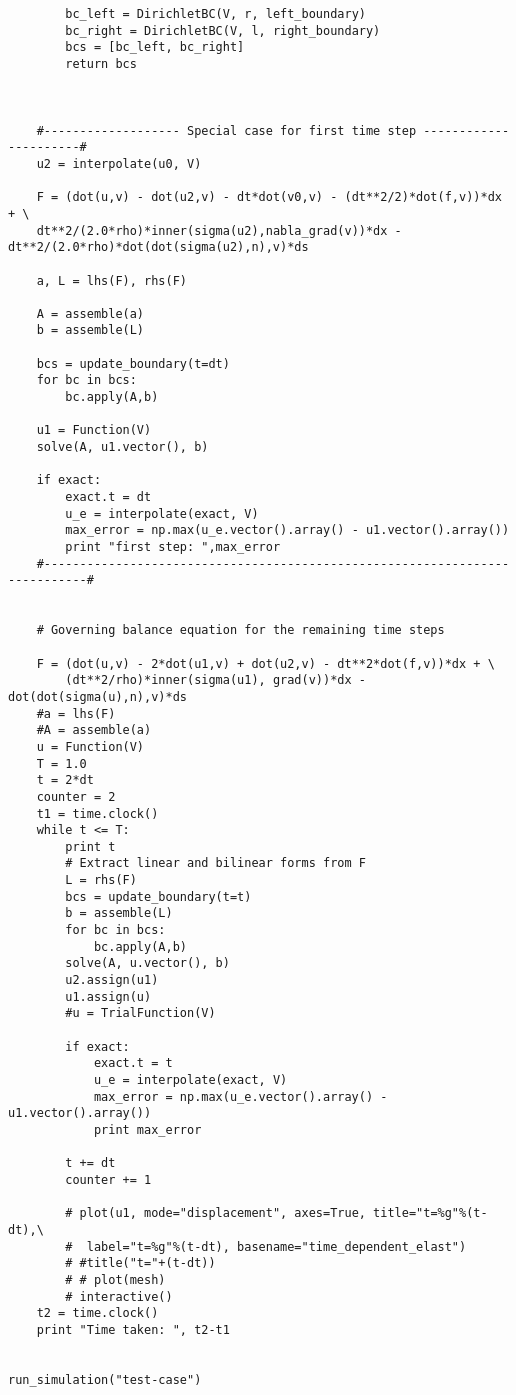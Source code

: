 \documentclass[twoside]{article}
\begin{document}
\begin{verbatim}
		bc_left = DirichletBC(V, r, left_boundary)
		bc_right = DirichletBC(V, l, right_boundary)
		bcs = [bc_left, bc_right]
		return bcs



	#------------------- Special case for first time step ----------------------#
	u2 = interpolate(u0, V)

	F = (dot(u,v) - dot(u2,v) - dt*dot(v0,v) - (dt**2/2)*dot(f,v))*dx + \
	dt**2/(2.0*rho)*inner(sigma(u2),nabla_grad(v))*dx - dt**2/(2.0*rho)*dot(dot(sigma(u2),n),v)*ds

	a, L = lhs(F), rhs(F)

	A = assemble(a)
	b = assemble(L)

	bcs = update_boundary(t=dt)
	for bc in bcs:
		bc.apply(A,b)

	u1 = Function(V)
	solve(A, u1.vector(), b)

	if exact:
		exact.t = dt
		u_e = interpolate(exact, V)
		max_error = np.max(u_e.vector().array() - u1.vector().array())
		print "first step: ",max_error
	#----------------------------------------------------------------------------#


	# Governing balance equation for the remaining time steps

	F = (dot(u,v) - 2*dot(u1,v) + dot(u2,v) - dt**2*dot(f,v))*dx + \
		(dt**2/rho)*inner(sigma(u1), grad(v))*dx - dot(dot(sigma(u),n),v)*ds
	#a = lhs(F)
	#A = assemble(a)
	u = Function(V)
	T = 1.0
	t = 2*dt
	counter = 2
	t1 = time.clock()
	while t <= T:
		print t
		# Extract linear and bilinear forms from F
		L = rhs(F)
		bcs = update_boundary(t=t)
		b = assemble(L)
		for bc in bcs:
			bc.apply(A,b)
		solve(A, u.vector(), b)
		u2.assign(u1)
		u1.assign(u)
		#u = TrialFunction(V)

		if exact:
			exact.t = t
			u_e = interpolate(exact, V)
			max_error = np.max(u_e.vector().array() - u1.vector().array())
			print max_error

		t += dt
		counter += 1

		# plot(u1, mode="displacement", axes=True, title="t=%g"%(t-dt),\
		#  label="t=%g"%(t-dt), basename="time_dependent_elast")
		# #title("t="+(t-dt))
		# # plot(mesh)
		# interactive()
	t2 = time.clock()
	print "Time taken: ", t2-t1


run_simulation("test-case")
\end{verbatim}
\end{document}
